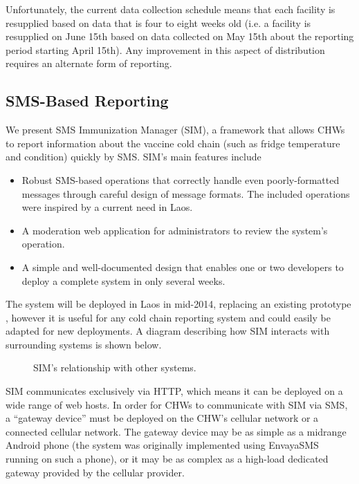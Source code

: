 \documentclass{acm_proc_article-sp}
\begin{document}
Unfortunately, the current data collection schedule means that each facility is resupplied based on data that is four to eight weeks old (i.e. a facility is resupplied on June 15th based on data collected on May 15th about the reporting period starting April 15th). Any improvement in this aspect of distribution requires an alternate form of reporting.

\subsection{SMS-Based Reporting}

We present SMS Immunization Manager (SIM), a framework that allows CHWs to report information about the vaccine cold chain (such as fridge temperature and condition) quickly by SMS. SIM's main features include 

\begin{itemize}
\item Robust SMS-based operations that correctly handle even poorly-formatted messages through careful design of message formats. The included operations were inspired by a current need in Laos.
\item A moderation web application for administrators to review the system's operation.
\item A simple and well-documented design that enables one or two developers to deploy a complete system in only several weeks.
\end{itemize}

The system will be deployed in Laos in mid-2014, replacing an existing prototype \cite{unicefstories}, however it is useful for any cold chain reporting system and could easily be adapted for new deployments. A diagram describing how SIM interacts with surrounding systems is shown below.

\begin{figure*}
\centering
{}
\caption{SIM's relationship with other systems.}
\end{figure*}

SIM communicates exclusively via HTTP, which means it can be deployed on a wide range of web hosts. In order for CHWs to communicate with SIM via SMS, a ``gateway device'' must be deployed on the CHW's cellular network or a connected cellular network. The gateway device may be as simple as a midrange Android phone (the system was originally implemented using EnvayaSMS running on such a phone), or it may be as complex as a high-load dedicated gateway provided by the cellular provider. 
\end{document}
